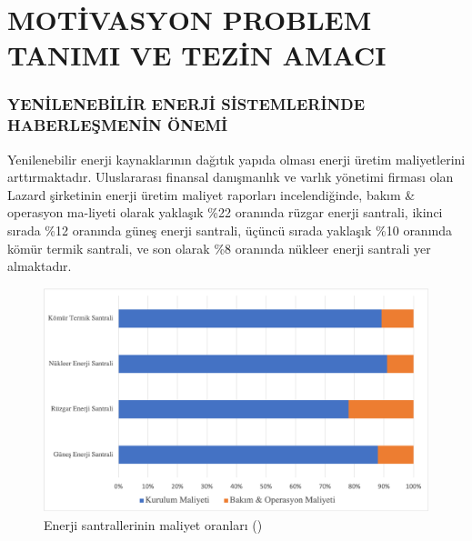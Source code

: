 \part{MOTİVASYON PROBLEM TANIMI VE TEZİN AMACI}
\thispagestyle{empty}
\newpage
\section{YENİLENEBİLİR ENERJİ SİSTEMLERİNDE HABERLEŞMENİN ÖNEMİ} \label{onem}




Yenilenebilir enerji kaynaklarının dağıtık yapıda olması enerji üretim maliyetlerini arttırmaktadır. Uluslararası finansal danışmanlık ve varlık yönetimi firması olan Lazard şirketinin enerji üretim maliyet raporları incelendiğinde, bakım \& operasyon ma-liyeti olarak yaklaşık \%22 oranında rüzgar enerji santrali, ikinci sırada \%12 oranında güneş enerji santrali, üçüncü sırada yaklaşık \%10 oranında kömür termik santrali, ve son olarak \%8 oranında nükleer enerji santrali yer almaktadır.


\begin{figure}[htbp]
\centerline{\includegraphics[width=\columnwidth]{Resim/chartbar.png}}
\caption{Enerji santrallerinin maliyet oranları (\protect{}) }
\label{fig:Lazards}
\end{figure}






